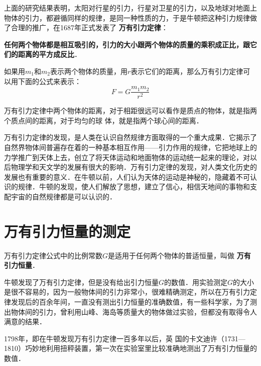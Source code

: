 上面的研究结果表明，太阳对行星的引力，行星对卫星的引力，以及地球对地面上物体的引力，都避循同样的规律，是同一种性质的力，于是牛顿把这种引力规律做了合理的推广，在1687年正式发表了\textbf{ 万有引力定律}：

\textbf{ 任何两个物体都是相互吸引的，引力的大小跟两个物体的质量的乘积成正比，跟它们的距离的平方成反比}．

如果用$m_1$和$m_2$表示两个物体的质量，用$r$表示它们的距离，那么万有引力定律可以用下面的公式来表示：
\begin{equation}
	F=G\frac{m_1m_2}{r^2}
\end{equation}

万有引力定律中两个物体的距离，对于相距很远可以看作是质点的物体，就是指两个质点间的距离，对于均匀的球
体，就是指两个球心间的距离．

万有引力定律的发现，是人类在认识自然规律方面取得的一个重大成果．它揭示了自然界物体间普遍存在着的一种基本相互作用——引力作用的规律，它把地球上的力学推广到天体上去，创立了将天体运动和地面物体的运动统一起来的理论，对以后物理学和天文学的发展有很大的影响．万有引力定律的发现，对人类文化历史的发展也有重要的意义．在牛顿以前，人们认为天体的运动是神秘的，隐藏着不可认识的规律．牛顿的发现，使人们解放了思想，建立了信心，相信天地间的事物和支配宇宙的自然规律都是可以认识的．
\newpage
\section{万有引力恒量的测定}
万有引力定律公式中的比例常数$G$是适用于任何两个物体的普适恒量，叫做\textbf{ 万有引力恒量}．

牛顿发现了万有引力定律，但是没有给出引力恒量$G$的数值．用实验测定$G$的大小是很不容易的，因为一般物体间的引力非常小，很难精确测定，所以在万有引力定律发现后的百余年间，一直没有测出引力恒量的准确数值，有一些科学家，为了测出物体间的引力，曾利用山峰、海岛等质量大的物体做过实验，但都没有取得令人满意的结果．

1798年，即在牛顿发现万有引力定律一百多年以后，英
国的卡文迪许（1731—1810）巧妙地利用扭秤装置，第一次在实验室里比较准确地测出了万有引力恒量的数值．

